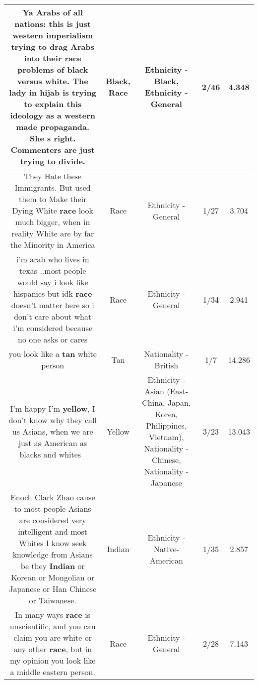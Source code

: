 \documentclass[11pt]{article}
\newlength\mylength
\begin{document}
\begin{center}
\begin{longtable}{|C{.65\mylength}|C{.30\mylength}|C{.12\mylength}|C{.12\mylength}|C{.12\mylength}|}
  \small Ya Arabs of all nations:  this is just western imperialism trying to drag Arabs into their \textbf{race} problems of \textbf{black} versus white. The lady in hijab is trying to explain this ideology as a western made propaganda. She s right. Commenters are just trying to divide.\normalsize   & Black, Race & Ethnicity - Black, Ethnicity - General & 2/46 & 4.348 \\  \hline
  \small They Hate these Immigrants. But used them to Make their Dying White \textbf{race} look much bigger, when in reality White are by far the Minority in America\normalsize   & Race & Ethnicity - General & 1/27 & 3.704 \\  \hline
  \small i'm arab who lives in texas ..most people would say i look like hispanics but idk \textbf{race} doesn't matter here so i don't care about what i'm considered because no one asks or cares\normalsize   & Race & Ethnicity - General & 1/34 & 2.941 \\  \hline
  \small you look like a \textbf{tan} white person\normalsize   & Tan & Nationality - British & 1/7 & 14.286 \\  \hline
  \small I'm happy I'm \textbf{y\textbf{e\textbf{llow}}}, I don't know why they call us Asians, when we are just as American as blacks and whites 🤣\normalsize   & Yellow & Ethnicity - Asian (East- China, Japan, Korea, Philippines, Vietnam), Nationality - Chinese, Nationality - Japanese & 3/23 & 13.043 \\  \hline
  \small Enoch Clark Zhao cause to most people Asians are considered very intelligent and most Whites I know seek knowledge from Asians be they \textbf{Indian} or Korean or Mongolian or Japanese or Han Chinese or Taiwanese.\normalsize   & Indian & Ethnicity - Native-American & 1/35 & 2.857 \\  \hline
  \small In many ways \textbf{race} is unscientific, and you can claim you are white or any other \textbf{race}, but in my opinion you look like a middle eastern person.\normalsize   & Race & Ethnicity - General & 2/28 & 7.143 \\  \hline

\end{longtable}
\end{center}
\end{document}
